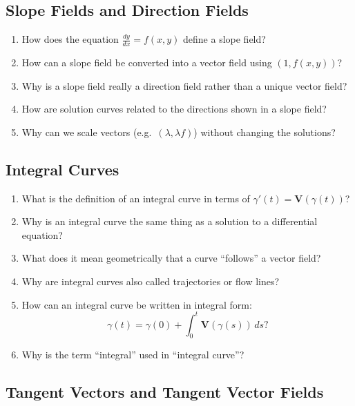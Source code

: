 \subsection{Slope Fields and Direction Fields}

\begin{enumerate}[resume]
  \item How does the equation $\frac{dy}{dx} = f(x,y)$ define a slope field?
  \item How can a slope field be converted into a vector field using $(1, f(x,y))$?
  \item Why is a slope field really a direction field rather than a unique vector field?
  \item How are solution curves related to the directions shown in a slope field?
  \item Why can we scale vectors (e.g.\ $(\lambda, \lambda f)$) without changing the solutions?
\end{enumerate}

\subsection{Integral Curves}

\begin{enumerate}[resume]
  \item What is the definition of an integral curve in terms of $\gamma'(t) = \mathbf{V}(\gamma(t))$?
  \item Why is an integral curve the same thing as a solution to a differential equation?
  \item What does it mean geometrically that a curve ``follows'' a vector field?
  \item Why are integral curves also called trajectories or flow lines?
  \item How can an integral curve be written in integral form:
    \[
      \gamma(t) = \gamma(0) + \int_0^t \mathbf{V}(\gamma(s))\,ds ?
    \]
  \item Why is the term ``integral'' used in ``integral curve''?
\end{enumerate}

\subsection{Tangent Vectors and Tangent Vector Fields}

